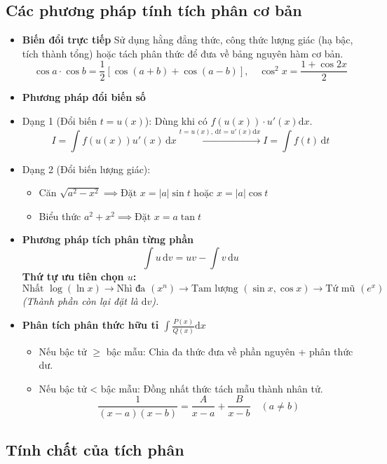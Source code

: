 \documentclass[12pt,a4paper,oneside]{book}
\theoremstyle{theorem}
\theoremstyle{definition}
\begin{document}
\subsection{Các phương pháp tính tích phân cơ bản}
\begin{itemize}
    \item \textbf {Biến đổi trực tiếp}
Sử dụng hằng đẳng thức, công thức lượng giác (hạ bậc, tích thành tổng) hoặc tách phân thức để đưa về bảng nguyên hàm cơ bản.
\[
\cos a \cdot \cos b = \frac{1}{2}\left[\cos(a+b) + \cos(a-b)\right], \quad \cos^2 x = \frac{1 + \cos 2x}{2}
\]
  \item \textbf{Phương pháp đổi biến số}
    \item[*]{Dạng 1 (Đổi biến $t = u(x)$):} Dùng khi có $f(u(x)) \cdot u'(x)\mathrm{d}x$.
    \[
    I = \int f(u(x)) u'(x)\,\mathrm{d}x \xrightarrow{t = u(x),\,\mathrm{d}t = u'(x)\mathrm{d}x} I = \int f(t)\,\mathrm{d}t
    \]
    \item[*]{Dạng 2 (Đổi biến lượng giác):}
    \begin{itemize}
        \item[+] Căn $\sqrt{a^2 - x^2} \implies \text{Đặt } x = |a|\sin t \text{ hoặc } x = |a|\cos t$
       \item[+] Biểu thức $a^2 + x^2 \implies \text{Đặt } x = a\tan t$
    \end{itemize}
\item \textbf{Phương pháp tích phân từng phần}
\[
\int u\,\mathrm{d}v = u v - \int v\,\mathrm{d}u
\]
\textbf{Thứ tự ưu tiên chọn $u$:} 
\[
\text{Nhất }\log (\ln x) \longrightarrow \text{Nhì đa } (x^n) \longrightarrow \text{Tam lượng } (\sin x, \cos x) \longrightarrow \text{Tứ mũ } (e^x)
\]
\textit{(Thành phần còn lại đặt là $\mathrm{d}v$).}

\item \textbf{ Phân tích phân thức hữu tỉ $\int \frac{P(x)}{Q(x)}\mathrm{d}x$}
\begin{itemize}
    \item[*]{Nếu bậc tử $\ge$ bậc mẫu:} Chia đa thức đưa về phần nguyên + phân thức dư.
    \item[*]{Nếu bậc tử < bậc mẫu:} Đồng nhất thức tách mẫu thành nhân tử.
    \[
    \frac{1}{(x-a)(x-b)} = \frac{A}{x-a} + \frac{B}{x-b} \quad (a \neq b)
    \]
    \end{itemize}
\end{itemize}
\subsection{Tính chất của tích phân}
\end{document}
